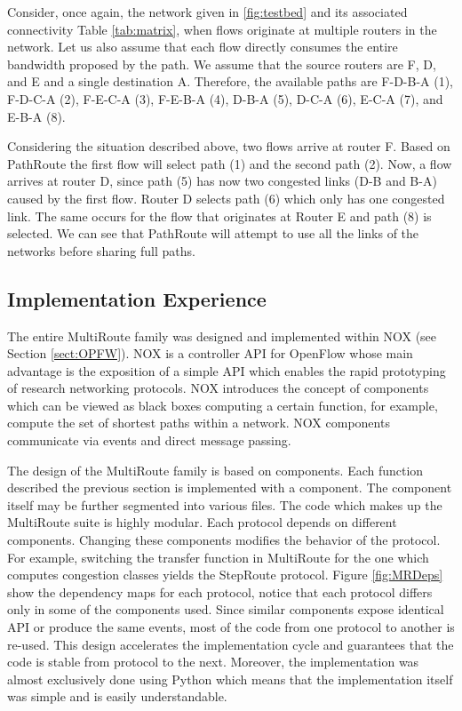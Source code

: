 Consider, once again, the network given in \ref{fig:testbed} and its associated
connectivity Table \ref{tab:matrix}, when flows originate at multiple routers in
the network. Let us also assume that each flow directly consumes the entire
bandwidth proposed by the path. We assume that the source routers are F, D, and E and a single destination
A. Therefore, the available paths are F-D-B-A (1), F-D-C-A (2), F-E-C-A (3), 
F-E-B-A (4), D-B-A (5), D-C-A (6), E-C-A (7), and E-B-A (8). 

Considering the situation described above, two flows arrive at router F. Based on PathRoute the first flow will select path (1) and the second path (2). Now, a flow arrives at router D, since path (5) has now two congested links (D-B and B-A) caused by the first flow. Router D selects path (6) which only has one congested link. The same occurs for the flow that originates at Router E and path (8) is selected.  We can see that PathRoute will attempt to use all the links of the networks before sharing full paths.
	
\subsection{Implementation Experience}

The entire MultiRoute family was designed and implemented within NOX (see
Section \ref{sect:OPFW}). NOX is a controller API for OpenFlow whose main
advantage is the exposition of a simple API  which enables the rapid
prototyping of research networking protocols. NOX introduces the concept of
components which can be viewed as black boxes computing a certain function, for
example, compute the set of shortest paths within a network. NOX components
communicate via events and direct message passing.


The design of the MultiRoute family is based on components. Each function
described the previous section is implemented with a component. The component
itself may be further segmented into various files. The code which makes up the
MultiRoute suite is highly modular. Each protocol depends on different
components. Changing these components modifies the behavior of the protocol. For
example, switching the transfer function in MultiRoute for the one which
computes congestion classes yields the StepRoute protocol. Figure
\ref{fig:MRDeps} show the dependency maps for each protocol, notice that each
protocol differs only in some of the components used. Since similar components
expose identical API or produce the same events, most of the code from one
protocol to another is re-used. This design accelerates the implementation cycle
and guarantees that the code is stable from protocol to the next. Moreover, the
implementation was almost exclusively done using Python \cite{Python} which
means that the implementation itself was simple and is easily understandable.
  
